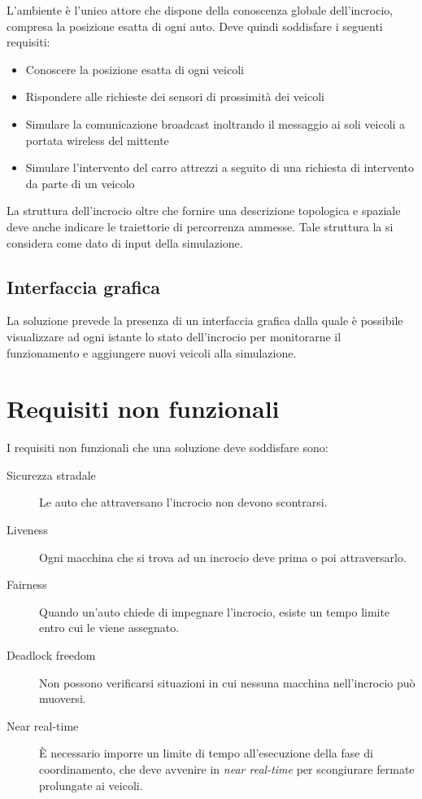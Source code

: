 \documentclass{memoir}
\begin{document}
L'ambiente è l'unico attore che dispone della conoscenza globale dell'incrocio,
compresa la posizione esatta di ogni auto. Deve quindi soddisfare i seguenti
requisiti:
\begin{itemize}
\item Conoscere la posizione esatta di ogni veicoli
\item Rispondere alle richieste dei sensori di prossimità dei veicoli
\item Simulare la comunicazione broadcast inoltrando il messaggio ai soli
  veicoli a portata wireless del mittente
\item Simulare l'intervento del carro attrezzi a seguito di una richiesta di
  intervento da parte di un veicolo
\end{itemize}

La struttura dell'incrocio oltre che fornire una descrizione topologica e
spaziale deve anche indicare le traiettorie di percorrenza ammesse. Tale
struttura la si considera come dato di input della simulazione.

\subsection{Interfaccia grafica}

La soluzione prevede la presenza di un interfaccia grafica dalla quale è
possibile visualizzare ad ogni istante lo stato dell'incrocio per monitorarne il
funzionamento e aggiungere nuovi veicoli alla simulazione.


\section{Requisiti non funzionali}
I requisiti non funzionali che una soluzione deve soddisfare sono:
\begin{description}
\item[Sicurezza stradale] Le auto che attraversano l'incrocio non devono
  scontrarsi.
\item[Liveness] Ogni macchina che si trova ad un incrocio deve prima o poi
  attraversarlo.
\item[Fairness] Quando un'auto chiede di impegnare l'incrocio, esiste un tempo
  limite entro cui le viene assegnato.
\item[Deadlock freedom] Non possono verificarsi situazioni in cui nessuna
  macchina nell'incrocio può muoversi.
\item[Near real-time] È necessario imporre un limite di tempo all'esecuzione
  della fase di coordinamento, che deve avvenire in \emph{near real-time} per
  scongiurare fermate prolungate ai veicoli.
\end{description}
\end{document}
